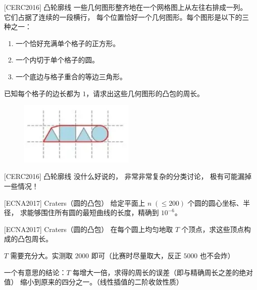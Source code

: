 \documentclass{beamer}
\begin{document}
\begin{frame}{[CERC2016] 凸轮廓线}
    一些几何图形整齐地在一个网格图上从左往右排成一列。它们占据了连续的一段横行，
    每个位置恰好一个几何图形。每个图形是以下的三种之一：

    \begin{enumerate}
        \item 一个恰好充满单个格子的正方形。
        \item 一个内切于单个格子的圆。
        \item 一个底边与格子重合的等边三角形。
    \end{enumerate}

    已知每个格子的边长都为 $1$，请求出这些几何图形的凸包的周长。

    \begin{figure}[H]
        \centering
        \includegraphics[width=0.5\textwidth]{pic/cerc2016.png}
    \end{figure}
\end{frame}

\begin{frame}{[CERC2016] 凸轮廓线}
    \small
    没什么好说的，
    非常非常复杂的分类讨论，
    极有可能漏掉一些情况！
\end{frame}

\begin{frame}{[ECNA2017] Craters（圆的凸包）}
    给定平面上 $n\;(\leq 200)$ 个圆的圆心坐标、半径，
    求能够围住所有圆的最短曲线的长度，精确到 $10^{-6}$。
\end{frame}

\begin{frame}{[ECNA2017] Craters（圆的凸包）}
    在每个圆上均匀地取 $T$ 个顶点，求这些顶点构成的凸包周长。

    \vspace{1em}
    $T$ 需要充分大。实测取 $2000$ 即可（比赛时尽量取大，反正 $5000$ 也不会炸）

    \vspace{1em}\pause
    一个有意思的结论：$T$ 每增大一倍，求得的周长的误差（即与精确周长之差的绝对值）
    缩小到原来的四分之一。（线性插值的二阶收敛性质）
\end{frame}
\end{document}
